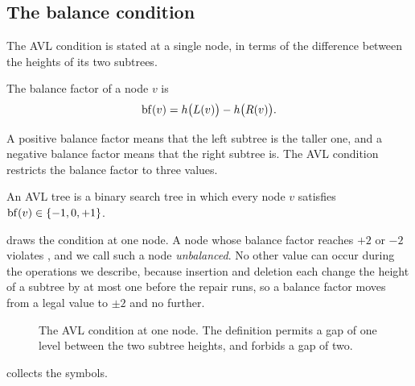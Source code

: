 \subsection{The balance condition}

The AVL condition is stated at a single node, in terms of the difference between
the heights of its two subtrees.

\begin{definition}
\label{def:bf}
The balance factor of a node $v$ is
\begin{equation}
  \label{eq:bf}
  \operatorname{bf}(v) = h\bigl(L(v)\bigr) - h\bigl(R(v)\bigr).
\end{equation}
\end{definition}

A positive balance factor means that the left subtree is the taller one, and a
negative balance factor means that the right subtree is. The AVL condition
restricts the balance factor to three values.

\begin{definition}
\label{def:avl}
An AVL tree is a binary search tree in which every node $v$ satisfies
$\operatorname{bf}(v) \in \{-1, 0, +1\}$.
\end{definition}

 draws the condition at one node. A node whose balance factor
reaches $+2$ or $-2$ violates , and we call such a node
\emph{unbalanced}. No other value can occur during the operations we describe,
because insertion and deletion each change the height of a subtree by at most one
before the repair runs, so a balance factor moves from a legal value to $\pm 2$
and no further.

\begin{figure}[t]
  \centering
  
  \caption{The AVL condition at one node. The definition permits a gap of one
  level between the two subtree heights, and forbids a gap of two.}
  \label{fig:balance}
\end{figure}

 collects the symbols.

